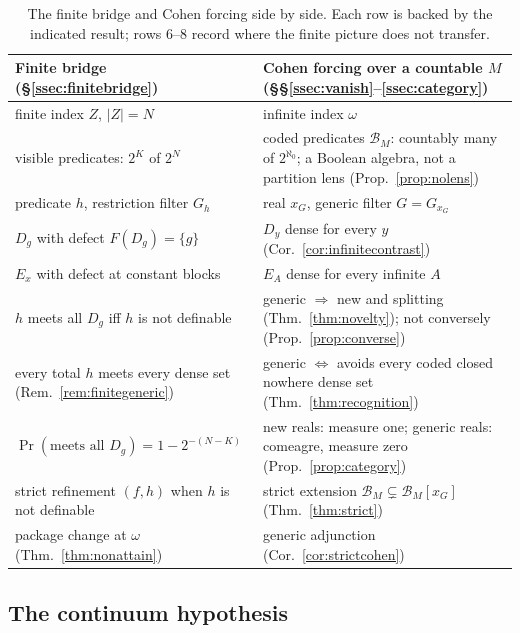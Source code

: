 \begin{table}[tbp]\centering
\small
\begin{tabular}{@{}p{}p{}@{}}
\toprule
Finite bridge (\S\ref{ssec:finitebridge}) & Cohen forcing over a countable $M$ (\S\S\ref{ssec:vanish}--\ref{ssec:category}) \\
\midrule
finite index $Z$, $|Z|=N$ & infinite index $\omega$ \\
visible predicates: $2^K$ of $2^N$ & coded predicates $\mathcal B_M$: countably many of $2^{\aleph_0}$; a Boolean algebra, not a partition lens (Prop.~\ref{prop:nolens}) \\
predicate $h$, restriction filter $G_h$ & real $x_G$, generic filter $G=G_{x_G}$ \\
$D_g$ with defect $F(D_g)=\{g\}$ & $D_y$ dense for every $y$ (Cor.~\ref{cor:infinitecontrast}) \\
$E_x$ with defect at constant blocks & $E_A$ dense for every infinite $A$ \\
$h$ meets all $D_g$ iff $h$ is not definable & generic $\Rightarrow$ new and splitting (Thm.~\ref{thm:novelty}); not conversely (Prop.~\ref{prop:converse}) \\
every total $h$ meets every dense set (Rem.~\ref{rem:finitegeneric}) & generic $\Leftrightarrow$ avoids every coded closed nowhere dense set (Thm.~\ref{thm:recognition}) \\
$\Pr(\text{meets all }D_g)=1-2^{-(N-K)}$ & new reals: measure one; generic reals: comeagre, measure zero (Prop.~\ref{prop:category}) \\
strict refinement $(f,h)$ when $h$ is not definable & strict extension $\mathcal B_M\subsetneq\mathcal B_M[x_G]$ (Thm.~\ref{thm:strict}) \\
package change at $\omega$ (Thm.~\ref{thm:nonattain}) & generic adjunction (Cor.~\ref{cor:strictcohen}) \\
\bottomrule
\end{tabular}
\caption{The finite bridge and Cohen forcing side by side. Each row is backed by the indicated
result; rows 6--8 record where the finite picture does not transfer.}\label{tab:correspondence}
\end{table}

\subsection{The continuum hypothesis}\label{sec:ch}


